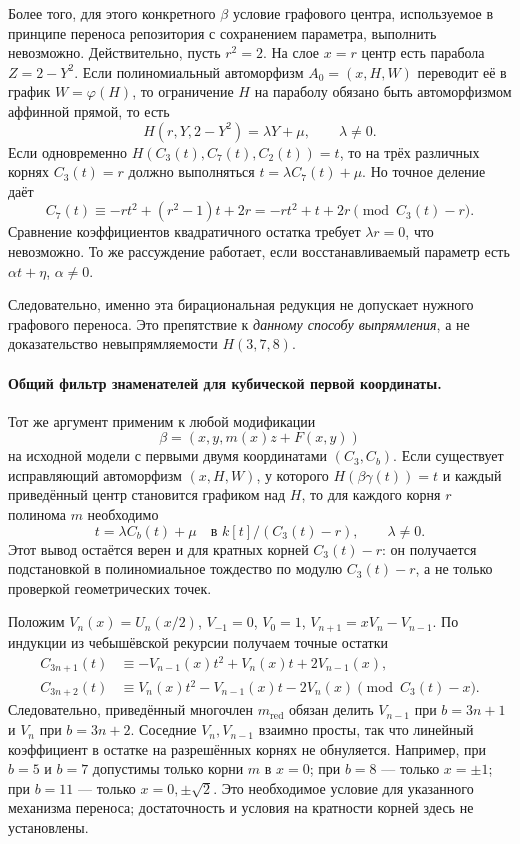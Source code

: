 Более того, для этого конкретного $\beta$ условие графового центра,
используемое в принципе переноса репозитория с сохранением параметра,
выполнить невозможно. Действительно, пусть $r^2=2$. На слое $x=r$
центр есть парабола $Z=2-Y^2$. Если полиномиальный автоморфизм
$A_0=(x,H,W)$ переводит её в график $W=\varphi(H)$, то ограничение
$H$ на параболу обязано быть автоморфизмом аффинной прямой, то есть
\[
 H(r,Y,2-Y^2)=\lambda Y+\mu,\qquad\lambda\ne0.
\]
Если одновременно $H(C_3(t),C_7(t),C_2(t))=t$, то на трёх
различных корнях $C_3(t)=r$ должно выполняться
$t=\lambda C_7(t)+\mu$. Но точное деление даёт
\[
 C_7(t)\equiv-r t^2+(r^2-1)t+2r
 =-r t^2+t+2r\pmod{C_3(t)-r}.
\]
Сравнение коэффициентов квадратичного остатка требует
$\lambda r=0$, что невозможно. То же рассуждение работает, если
восстанавливаемый параметр есть $\alpha t+\eta$, $\alpha\ne0$.

Следовательно, именно эта бирациональная редукция не допускает
нужного графового переноса. Это препятствие к \emph{данному способу
выпрямления}, а не доказательство невыпрямляемости $H(3,7,8)$.

\paragraph{Общий фильтр знаменателей для кубической первой координаты.}
Тот же аргумент применим к любой модификации
\[
 \beta=(x,y,m(x)z+F(x,y))
\]
на исходной модели с первыми двумя координатами $(C_3,C_b)$.
Если существует исправляющий автоморфизм $(x,H,W)$, у которого
$H(\beta\gamma(t))=t$ и каждый приведённый центр становится графиком
над $H$, то для каждого корня $r$ полинома $m$ необходимо
\[
 t=\lambda C_b(t)+\mu\quad\text{в }k[t]/(C_3(t)-r),\qquad\lambda\ne0.
\]
Этот вывод остаётся верен и для кратных корней $C_3(t)-r$:
он получается подстановкой в полиномиальное тождество по модулю
$C_3(t)-r$, а не только проверкой геометрических точек.

Положим $V_n(x)=U_n(x/2)$, $V_{-1}=0$, $V_0=1$,
$V_{n+1}=xV_n-V_{n-1}$. По индукции из чебышёвской рекурсии
получаем точные остатки
\[
\begin{aligned}
 C_{3n+1}(t)&\equiv -V_{n-1}(x)t^2+V_n(x)t+2V_{n-1}(x),\\
 C_{3n+2}(t)&\equiv V_n(x)t^2-V_{n-1}(x)t-2V_n(x)
 \pmod{C_3(t)-x}.
\end{aligned}
\]
Следовательно, приведённый многочлен $m_{\mathrm{red}}$ обязан делить
$V_{n-1}$ при $b=3n+1$ и $V_n$ при $b=3n+2$.
Соседние $V_n,V_{n-1}$ взаимно просты, так что линейный коэффициент
в остатке на разрешённых корнях не обнуляется.
Например, при $b=5$ и $b=7$ допустимы только корни $m$ в $x=0$;
при $b=8$ --- только $x=\pm1$; при $b=11$ --- только
$x=0,\pm\sqrt2$.
Это необходимое условие для указанного механизма переноса;
достаточность и условия на кратности корней здесь не установлены.
